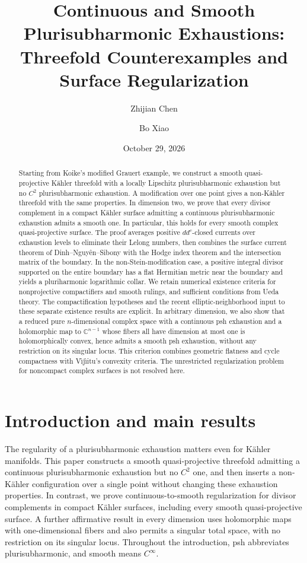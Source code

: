 \documentclass[11pt]{amsart}
\title[Continuous and smooth plurisubharmonic exhaustions]{Continuous and Smooth
Plurisubharmonic Exhaustions:\\
Threefold Counterexamples and Surface Regularization}
\author{Zhijian Chen}
\author{Bo Xiao}
\date{October 29, 2026}
\theoremstyle{definition}
\theoremstyle{remark}
\numberwithin{equation}{section}
\newcommand{\C}{\mathbb C}
\begin{document}
\begin{abstract}
Starting from Koike's modified Grauert example, we construct a smooth
quasi-projective K\"ahler threefold with a locally Lipschitz
plurisubharmonic exhaustion but no $C^2$ plurisubharmonic exhaustion.
A modification over one point gives a non-K\"ahler threefold with the
same properties.  In dimension two, we prove that every divisor
complement in a compact K\"ahler surface admitting a continuous
plurisubharmonic exhaustion admits a smooth one.  In particular, this
holds for every smooth complex quasi-projective surface.  The proof
averages positive $dd^c$-closed currents over exhaustion levels to
eliminate their Lelong numbers, then combines the surface current
theorem of Dinh--Nguy\^en--Sibony with the Hodge index theorem and
the intersection matrix of the boundary.  In the non-Stein-modification
case, a positive integral divisor supported on the entire boundary has
a flat Hermitian metric near the boundary and yields a pluriharmonic
logarithmic collar.  We retain numerical existence criteria for
nonprojective compactifiers and smooth rulings, and sufficient
conditions from Ueda theory.  The compactification hypotheses and the
recent elliptic-neighborhood input to these separate existence results
are explicit.  In arbitrary dimension, we also show that a reduced
pure $n$-dimensional complex space with a continuous psh exhaustion
and a holomorphic map to $\C^{n-1}$ whose fibers all have dimension
at most one is holomorphically convex, hence admits a smooth psh
exhaustion, without any restriction on its singular locus.  This
criterion combines geometric flatness and cycle compactness with
V\^{\i}j\^{\i}itu's convexity criteria.  The unrestricted regularization
problem for noncompact complex surfaces is not resolved here.
\end{abstract}

\maketitle

\section{Introduction and main results}\label{sec:intro}

The regularity of a plurisubharmonic exhaustion matters even for
K\"ahler manifolds.  This paper constructs a smooth quasi-projective
threefold admitting a continuous plurisubharmonic exhaustion but no
$C^2$ one, and then inserts a non-K\"ahler configuration over a single
point without changing these exhaustion properties.  In contrast, we
prove continuous-to-smooth regularization for divisor complements in
compact K\"ahler surfaces, including every smooth quasi-projective
surface.  A further affirmative result in every dimension uses
holomorphic maps with one-dimensional fibers and also permits a
singular total space, with no restriction on its singular locus.
Throughout the introduction, psh abbreviates plurisubharmonic,
and smooth means $C^\infty$.
\end{document}
